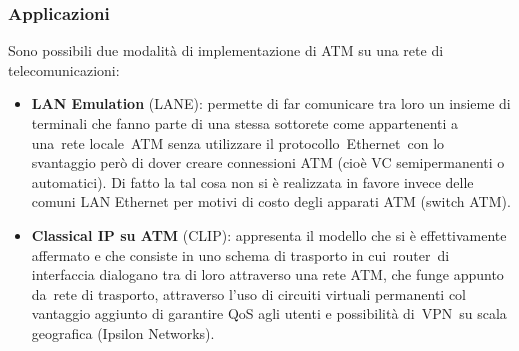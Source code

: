 \documentclass[8pt]{extarticle}
\begin{document}
\subsubsection{Applicazioni}
Sono possibili due modalità di implementazione di ATM su una rete di telecomunicazioni:\\
\begin{itemize}
    \item \textbf{LAN Emulation} (LANE): permette di far comunicare tra loro un insieme di terminali che 
    fanno parte di una stessa sottorete come appartenenti a una rete locale ATM senza utilizzare il 
    protocollo Ethernet con lo svantaggio però di dover creare connessioni ATM (cioè VC semipermanenti o 
    automatici). Di fatto la tal cosa non si è realizzata in favore invece delle comuni LAN Ethernet per 
    motivi di costo degli apparati ATM (switch ATM).
    \item \textbf{Classical IP su ATM} (CLIP): appresenta il modello che si è effettivamente affermato e 
    che consiste in uno schema di trasporto in cui router di interfaccia dialogano tra di loro attraverso 
    una rete ATM, che funge appunto da rete di trasporto, attraverso l'uso di circuiti virtuali permanenti 
    col vantaggio aggiunto di garantire QoS agli utenti e possibilità di VPN su scala geografica 
    (Ipsilon Networks).
\end{itemize}
\end{document}
